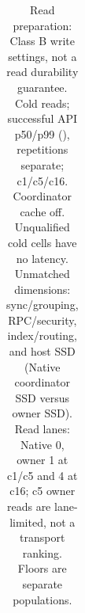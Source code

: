 \begin{table}[H]
\begin{tabular}{lrrrrr}
\bottomrule\end{tabular}
\caption{Read preparation: Class B write settings, not a read durability guarantee. Cold reads; successful API p50/p99 (\us{}), repetitions separate; c1/c5/c16. Coordinator cache off. Unqualified cold cells have no latency. Unmatched dimensions: sync/grouping, RPC/security, index/routing, and host SSD (Native coordinator SSD versus owner SSD). Read lanes: Native 0, owner 1 at c1/c5 and 4 at c16; c5 owner reads are lane-limited, not a transport ranking. Floors are separate populations.}
\end{table}
